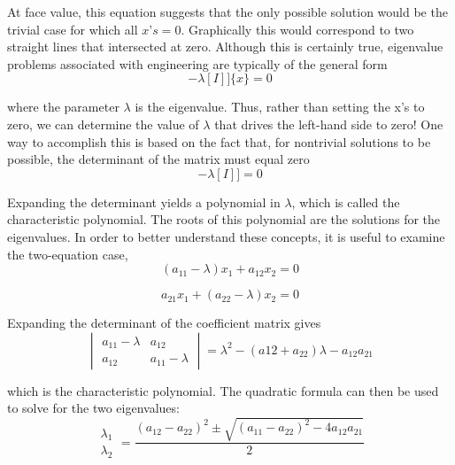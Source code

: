\documentclass[../main.tex]{subfiles}
\begin{document}
At face value, this equation suggests that the only possible solution would be the trivial
case for which all $x’s = 0$. Graphically this would correspond to two straight lines that intersected at zero.
Although this is certainly true, eigenvalue problems associated with engineering are
typically of the general form
\begin{equation}
[[A]-\lambda[I]]\{x\}=0 \tag{13.3}
\end{equation}

where the parameter $\lambda$ is the eigenvalue. Thus, rather than setting the x's to zero, we can
determine the value of $\lambda$ that drives the left-hand side to zero! One way to accomplish this
is based on the fact that, for nontrivial solutions to be possible, the determinant of the matrix must equal zero
\begin{equation}
[[A]-\lambda[I]]=0 \tag{13.4}
\end{equation}

Expanding the determinant yields a polynomial in $\lambda$, which is called the characteristic
polynomial. The roots of this polynomial are the solutions for the eigenvalues.
In order to better understand these concepts, it is useful to examine the two-equation
case,
\begin{equation}
(a_{11}-\lambda)x_{1}+a_{12}x_{2}=0
\end{equation}

\begin{equation}
a_{21}x_{1}+(a_{22}-\lambda)x_{2}=0 \tag{13.5}
\end{equation}

Expanding the determinant of the coefficient matrix gives
\begin{equation}
\begin{vmatrix}
a_{11}-\lambda  &a_{12} \\
a_{12} & a_{11}-\lambda
\end{vmatrix}
=\lambda ^{2}-(a{12}+a_{22})\lambda -a_{12}a_{21} \tag{13.6}
\end{equation}


which is the characteristic polynomial. The quadratic formula can then be used to solve for
the two eigenvalues:
\begin{equation}
\begin{matrix}
\lambda _{1}\\
\lambda _{2}
\end{matrix}
=\frac{(a_{12}-a_{22})^{2}\pm \sqrt{(a_{11}-a_{22})^{2}-4a_{12}a_{21}}}{2} \tag{13.7}
\end{equation}
\end{document}
